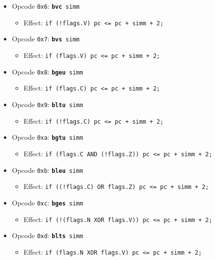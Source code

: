 \documentclass{article}
\begin{document}
\begin{itemize}
		\item Opcode \texttt{0x6}:
			\texttt{\textbf{bvc} simm}
		\begin{itemize}
			\item Effect:
				\texttt{if (!flags.V) pc <= pc + simm + 2;}
		\end{itemize}

		\item Opcode \texttt{0x7}:
			\texttt{\textbf{bvs} simm}
		\begin{itemize}
			\item Effect:
				\texttt{if (flags.V) pc <= pc + simm + 2;}
		\end{itemize}

		\item Opcode \texttt{0x8}:
			\texttt{\textbf{bgeu} simm}
		\begin{itemize}
			\item Effect:
				\texttt{if (flags.C) pc <= pc + simm + 2;}
		\end{itemize}

		\item Opcode \texttt{0x9}:
			\texttt{\textbf{bltu} simm}
		\begin{itemize}
			\item Effect:
				\texttt{if (!flags.C) pc <= pc + simm + 2;}
		\end{itemize}

		\item Opcode \texttt{0xa}:
			\texttt{\textbf{bgtu} simm}
		\begin{itemize}
			\item Effect:
				\texttt{if (flags.C AND (!flags.Z)) pc <= pc + simm + 2;}
		\end{itemize}

		\item Opcode \texttt{0xb}:
			\texttt{\textbf{bleu} simm}
		\begin{itemize}
			\item Effect:
				\texttt{if ((!flags.C) OR flags.Z) pc <= pc + simm + 2;}
		\end{itemize}

		\item Opcode \texttt{0xc}:
			\texttt{\textbf{bges} simm}
		\begin{itemize}
			\item Effect:
				\texttt{if (!(flags.N XOR flags.V)) pc <= pc + simm + 2;}
		\end{itemize}

		\item Opcode \texttt{0xd}:
			\texttt{\textbf{blts} simm}
		\begin{itemize}
			\item Effect:
				\texttt{if (flags.N XOR flags.V) pc <= pc + simm + 2;}
		\end{itemize}


\end{itemize}
\end{document}
